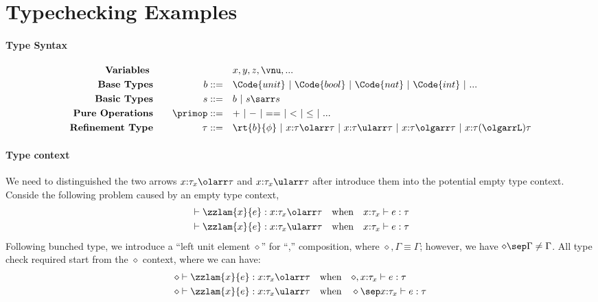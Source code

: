 \section{Typechecking Examples}

\paragraph{Type Syntax}
\begin{alignat*}{2}
    \text{\textbf{Variables }}& \quad &\quad& x, y, z, \vnu, ...
    \\\text{\textbf{Base Types}}& \quad & b  ::= \quad &  \Code{unit} ~|~ \Code{bool} ~|~ \Code{nat} ~|~ \Code{int} ~|~ ...
    \\\text{\textbf{Basic Types}}& \quad & s  ::= \quad &  b ~|~ s\sarr s
    \\\text{\textbf{Pure Operations}}& \quad & \primop ::= \quad & {+} ~|~ {-} ~|~ {==} ~|~ {<} ~|~ {\leq} ~|~ ...
    \\\text{\textbf{Refinement Type}}& \quad & \tau::= \quad & \rt{b}{\phi} ~|~ x{:}\tau \olarr \tau ~|~ x{:}\tau \ularr \tau ~|~ x{:}\tau \olgarr \tau ~|~ x{:}\tau (\olgarrL) \tau
  \end{alignat*}

\paragraph{Type context}
We need to distinguished the two arrows $x{:}\tau_x \olarr \tau$ and $x{:}\tau_x \ularr \tau$ after introduce them into the potential empty type context. Conside the following problem caused by an empty type context,
\begin{align*}
    &\vdash \zzlam{x}{e} : x{:}\tau_x \olarr \tau \quad \text{when} \quad x{:}\tau_x \vdash e : \tau \\
    &\vdash \zzlam{x}{e} : x{:}\tau_x \ularr \tau \quad \text{when} \quad x{:}\tau_x \vdash e : \tau
\end{align*}\noindent
Following bunched type, we introduce a ``left unit element $\diamond$'' for ``,'' composition, where $\diamond, \Gamma \equiv \Gamma$; however, we have $\diamond \sep \Gamma \neq \Gamma$. All type check required start from the $\diamond$ context, where we can have:
\begin{align*}
    &\diamond \vdash \zzlam{x}{e} : x{:}\tau_x \olarr \tau \quad \text{when} \quad \diamond, x{:}\tau_x \vdash e : \tau \\
    &\diamond \vdash \zzlam{x}{e} : x{:}\tau_x \ularr \tau \quad \text{when} \quad \diamond \sep x{:}\tau_x \vdash e : \tau
\end{align*}\noindent

